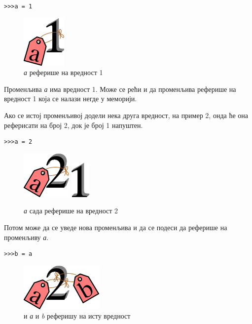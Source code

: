 \begin{lstlisting}
>>>a = 1
\end{lstlisting}

\begin{figure}[here]
\centering
\includegraphics{1a.png}
\caption{\emph{а} реферише на вредност 1}
\label{slike:a_je_1}
\end{figure}

Променљива \emph{а} има вредност 1. Може се рећи и да променљива реферише на вредност 1 која се налази негде у меморији.

Ако се истој променљивој додели нека друга вредност, на пример 2, онда ће она реферисати на број 2, док је број 1 напуштен.

\begin{lstlisting}
>>>a = 2
\end{lstlisting}

\begin{figure}[here]
\centering
\includegraphics{2a.png}
\includegraphics{1.png}
\caption{\emph{а} сада реферише на вредност 2}
\label{slike:a_je_2}
\end{figure}

Потом може да се уведе нова променљива и да се подеси да реферише на променљиву \emph{а}.

\begin{lstlisting}
>>>b = a
\end{lstlisting}

\begin{figure}[here]
\centering
\includegraphics{2ab.png}
\caption{и \emph{а} и \emph{b} реферишу на исту вредност}
\label{slike:a_b_je_2}
\end{figure}

